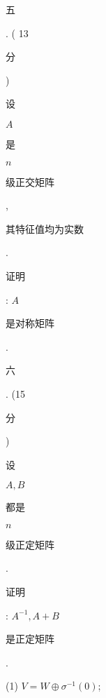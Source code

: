 \documentclass[10pt]{article}
\begin{document}
\begin{CJK}{UTF8}{mj}五\end{CJK}. ( 13 \begin{CJK}{UTF8}{mj}分\end{CJK}) \begin{CJK}{UTF8}{mj}设\end{CJK} $A$ \begin{CJK}{UTF8}{mj}是\end{CJK} $n$ \begin{CJK}{UTF8}{mj}级正交矩阵\end{CJK}, \begin{CJK}{UTF8}{mj}其特征值均为实数\end{CJK}. \begin{CJK}{UTF8}{mj}证明\end{CJK}: $A$ \begin{CJK}{UTF8}{mj}是对称矩阵\end{CJK}.

\begin{CJK}{UTF8}{mj}六\end{CJK}. (15 \begin{CJK}{UTF8}{mj}分\end{CJK}) \begin{CJK}{UTF8}{mj}设\end{CJK} $A, B$ \begin{CJK}{UTF8}{mj}都是\end{CJK} $n$ \begin{CJK}{UTF8}{mj}级正定矩阵\end{CJK}. \begin{CJK}{UTF8}{mj}证明\end{CJK}: $A^{-1}, A+B$ \begin{CJK}{UTF8}{mj}是正定矩阵\end{CJK}.

(1) $V=W \oplus \sigma^{-1}(0)$;
\end{document}
